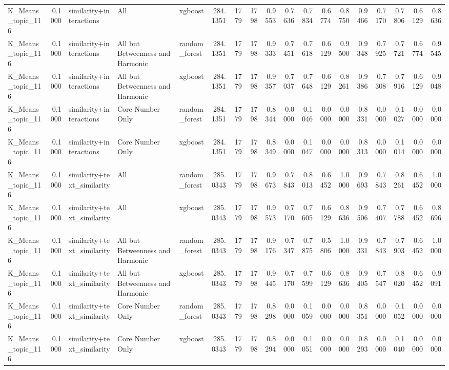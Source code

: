\begin{tabular}{lrlllrrrrrrrrrrrrr}
K_Means_topic_116 & 0.1000 & similarity+interactions & All & xgboost & 284.1351 & 1779 & 1798 & 0.9553 & 0.7636 & 0.7834 & 0.6774 & 0.8750 & 0.9466 & 0.7170 & 0.7806 & 0.6129 & 0.8636 \\
K_Means_topic_116 & 0.1000 & similarity+interactions & All but Betweenness and Harmonic & random_forest & 284.1351 & 1779 & 1798 & 0.9333 & 0.7451 & 0.7618 & 0.6129 & 0.9500 & 0.9348 & 0.7925 & 0.7721 & 0.6774 & 0.9545 \\
K_Means_topic_116 & 0.1000 & similarity+interactions & All but Betweenness and Harmonic & xgboost & 284.1351 & 1779 & 1798 & 0.9357 & 0.7037 & 0.7648 & 0.6129 & 0.8261 & 0.9386 & 0.7308 & 0.7916 & 0.6129 & 0.9048 \\
K_Means_topic_116 & 0.1000 & similarity+interactions & Core Number Only & random_forest & 284.1351 & 1779 & 1798 & 0.8344 & 0.0000 & 0.1046 & 0.0000 & 0.0000 & 0.8331 & 0.0000 & 0.1027 & 0.0000 & 0.0000 \\
K_Means_topic_116 & 0.1000 & similarity+interactions & Core Number Only & xgboost & 284.1351 & 1779 & 1798 & 0.8349 & 0.0000 & 0.1047 & 0.0000 & 0.0000 & 0.8313 & 0.0000 & 0.1014 & 0.0000 & 0.0000 \\
K_Means_topic_116 & 0.1000 & similarity+text_similarity & All & random_forest & 285.0343 & 1779 & 1798 & 0.9673 & 0.7843 & 0.8013 & 0.6452 & 1.0000 & 0.9693 & 0.7843 & 0.8261 & 0.6452 & 1.0000 \\
K_Means_topic_116 & 0.1000 & similarity+text_similarity & All & xgboost & 285.0343 & 1779 & 1798 & 0.9573 & 0.7170 & 0.7605 & 0.6129 & 0.8636 & 0.9506 & 0.7407 & 0.7788 & 0.6452 & 0.8696 \\
K_Means_topic_116 & 0.1000 & similarity+text_similarity & All but Betweenness and Harmonic & random_forest & 285.0343 & 1779 & 1798 & 0.9176 & 0.7347 & 0.7875 & 0.5806 & 1.0000 & 0.9331 & 0.7843 & 0.7903 & 0.6452 & 1.0000 \\
K_Means_topic_116 & 0.1000 & similarity+text_similarity & All but Betweenness and Harmonic & xgboost & 285.0343 & 1779 & 1798 & 0.9445 & 0.7170 & 0.7599 & 0.6129 & 0.8636 & 0.9405 & 0.7547 & 0.8020 & 0.6452 & 0.9091 \\
K_Means_topic_116 & 0.1000 & similarity+text_similarity & Core Number Only & random_forest & 285.0343 & 1779 & 1798 & 0.8298 & 0.0000 & 0.1059 & 0.0000 & 0.0000 & 0.8351 & 0.0000 & 0.1052 & 0.0000 & 0.0000 \\
K_Means_topic_116 & 0.1000 & similarity+text_similarity & Core Number Only & xgboost & 285.0343 & 1779 & 1798 & 0.8294 & 0.0000 & 0.1051 & 0.0000 & 0.0000 & 0.8293 & 0.0000 & 0.1040 & 0.0000 & 0.0000 \\

\end{tabular}
